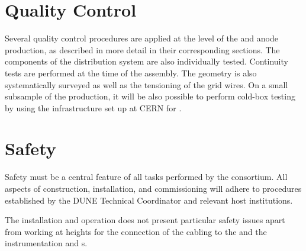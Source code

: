 \section{Quality Control}
\label{sec:fddp-crp-qc}

Several quality control 
procedures are applied at the level of the  and anode production, as described in more detail in their corresponding sections. The components of the  distribution system are also individually tested. Continuity tests are performed at the time of the  assembly. The  geometry is also systematically surveyed as well as the tensioning of the grid wires. On a small subsample of the  production, it will be also possible to perform cold-box testing by using the infrastructure set up at CERN for .







\section{Safety}
\label{sec:fddp-crp-safety}

Safety must be a central feature of all tasks performed by the  consortium.  All aspects of  construction, installation, and commissioning will adhere to procedures established by the DUNE Technical Coordinator and relevant host institutions. 

The  installation and operation does not present particular safety issues apart from working at heights %
for the connection of the   cabling to the  and the instrumentation and  \fdth{}s.



